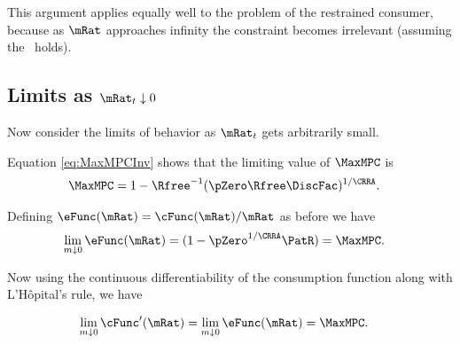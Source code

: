 \documentclass[BufferStockTheory]{subfiles}
\begin{document}
This argument applies equally well to the problem of the restrained
consumer, because as $\mRat$ approaches infinity the constraint becomes
irrelevant (assuming the \FHWC~holds).

\begin{comment}
  Of course, the constraint never becomes irrelevant if human wealth is
  infinite.  We ruled out infinite human wealth at the beginning of this
  section by assuming $\Rfree> \PGro$.  If this finite human wealth
  condition does not hold, it is possible to show that for any finite
  horizon consumer the marginal propensity to consume approaches the
  finite-horizon perfect foresight MPC as wealth approaches infinity.
  However, as the horizon gets longer, the perfect foresight MPC
  approaches zero.  It can be shown therefore that the limiting MPC for
  the converged consumption function approaches (but never reaches)
  zero.  (This is why we chose $\MinMinMPC=0$ if the \FHWC~fails
  in the proofs above.)
\end{comment}

\hypertarget{LimitsAsmtToZero}{}
\subsection{Limits as $\mRat_t \downarrow 0$}

\label{subsec:LimitsAsmtToZero} Now consider the limits of behavior as $\mRat_{t}$ gets
arbitrarily small.

Equation \eqref{eq:MaxMPCInv} shows that the limiting value of
$\MaxMPC$ is
\begin{align}
  \MaxMPC  & = 1-{\Rfree}^{-1}(\pZero  \Rfree\DiscFac)^{1/\CRRA}. \nonumber
\end{align}

Defining $\eFunc(\mRat)=\cFunc(\mRat)/\mRat$ as before we have
\begin{align}
  \lim_{m \downarrow 0} \eFunc(\mRat)  & = (1-\pZero^{1/\CRRA}\PatR) = \MaxMPC \nonumber.
\end{align}

Now using the continuous differentiability of the consumption function
along with L'H\^opital's rule, we have
\begin{comment}
  \begin{align*}
    \eFunc^{\prime}(\mRat)  & = \mRat^{-1} \cFunc^{\prime}(\mRat) - \mRat^{-2} \cFunc(\mRat)
    \\ \mRat \eFunc^{\prime}(\mRat)  & = \cFunc^{\prime}(\mRat) - \cFunc(\mRat)/\mRat
    \\ \cFunc^{\prime}(\mRat)  & = \eFunc(\mRat)+ \mRat \eFunc^{\prime}(\mRat)
  \end{align*}
  and since $0<\eFunc(\mRat)<1$ we have
\end{comment}
\begin{align}
  \lim_{m \downarrow 0} \cFunc^{\prime}(\mRat)  & = \lim_{m \downarrow 0}
                                                  \eFunc(\mRat) = \MaxMPC. \nonumber
\end{align}
\end{document}
